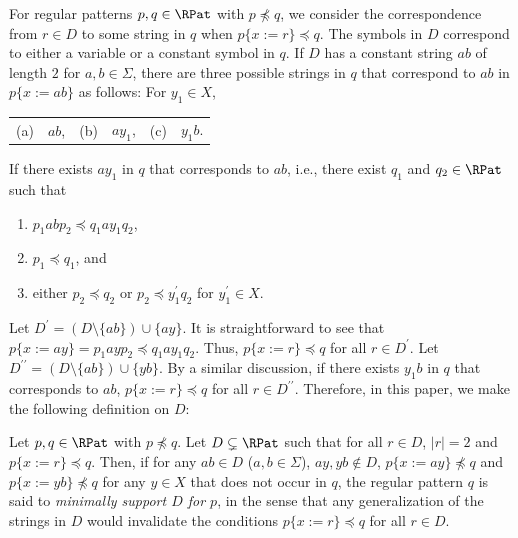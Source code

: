 {\color{black}For regular patterns $p,q\in\RPat$ with $p\not\preceq q$, we} consider the correspondence from $r\in D$ to some string in $q$ when $p \{ x := r \} \preceq q$.
The symbols in $D$ correspond to either a variable or a constant symbol in $q$.
If $D$ has a constant string $ab$ of length $2$ for $a,b\in\Sigma$, there are three possible strings in $q$ that correspond to $ab$ in $p\{x:=ab\}$ as follows: For $y_{1} \in X$,
  \begin{center}
    \begin{tabular}{cccccc}
      \textrm{(a)} & $ab$, & \textrm{(b)} & $ay_{1}$, & \textrm{(c)} & $y_{1}b$.
    \end{tabular}
  \end{center}

\noindent
If there exists $ay_{1}$ in $q$ that corresponds to $ab$, i.e., there exist $q_{1}$ and $q_{2}\in \RPat$ such that
  \begin{enumerate}
  \item[(1)] $p_{1}abp_{2} \preceq q_{1}ay_{1}q_{2}$, 
  \item[(2)] $p_{1} \preceq q_{1}$, and
  \item[(3)] either $p_{2} \preceq q_{2}$ or $p_{2} \preceq y_{1}^{\prime}q_{2}$ for $y_{1}^{\prime}\in X$.
  \end{enumerate}
Let $D^{\prime} = (D \setminus \{ab\}) \cup \{ay\}$.
It is straightforward to see that $p\{x:=ay\} = p_{1}ayp_{2} \preceq q_{1}ay_{1}q_{2}$.
Thus, $p \{ x := r \} \preceq q$ for all $r \in D^{\prime}$.
Let $D^{\prime\prime} = (D \setminus \{ab\}) \cup \{yb\}$.
By a similar discussion, if there exists $y_{1}b$ in $q$ that corresponds to $ab$, $p \{ x := r \} \preceq q$ for all $r \in D^{\prime\prime}$.
Therefore, in this paper, we make the following definition on $D$:

\smallskip

\begin{dfn}
Let $p,q \in \RPat$ {\color{black} with $p\not\preceq q$}.
Let $D \subsetneq \RPat$ such that for all $r\in D$, $|r| = 2$ and $p \{ x := r \} \preceq q$.
Then, if for any $ab\in D$ ($a,b\in\Sigma$), {\color{black} $ay,yb\not\in D$}, $p \{ x := ay \} \not\preceq q$ and $p \{ x := yb \} \not\preceq q$ for any $y \in X$ that does not occur in $q$,
{\color{black}the regular pattern $q$ is said to \textit{minimally support $D$ for $p$}, in the sense that any generalization of the strings in $D$ would invalidate the conditions $p\{x := r\} \preceq q$ for all $r\in D$}.

\end{dfn}

